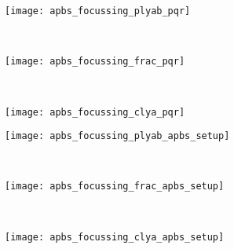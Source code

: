 \begin{figure*}[p]
  \centering
  \medskip
  \begin{minipage}[t]{50mm}
    \centering
    \begin{subfigure}[t]{50mm}
      \centering
      \caption{}\vspace{-5mm}\hspace{1.5mm}\label{fig:apbs_focussing_plyab_pqr}
      \texttt{[image: apbs\_focussing\_plyab\_pqr]}
    \end{subfigure}
    \\ \vspace{2mm}
    \centering
    \begin{subfigure}[t]{50mm}
      \centering
      \caption{}\vspace{-5mm}\hspace{1.5mm}\label{fig:apbs_focussing_frac_pqr}
      \texttt{[image: apbs\_focussing\_frac\_pqr]}
    \end{subfigure}
    \\ \vspace{2mm}
    \centering
    \begin{subfigure}[t]{50mm}
      \centering
      \caption{}\vspace{-5mm}\hspace{1.5mm}\label{fig:apbs_focussing_clya_pqr}
      \texttt{[image: apbs\_focussing\_clya\_pqr]}
    \end{subfigure}
  \end{minipage}
  \hspace{2mm}
  \begin{minipage}[t]{55mm}
    \centering
    \begin{subfigure}[t]{55mm}
      \centering
      \caption{}\vspace{-5mm}\hspace{1.5mm}\label{fig:apbs_focussing_plyab_apbs_setup}
      \texttt{[image: apbs\_focussing\_plyab\_apbs\_setup]}
    \end{subfigure}
    \\ \vspace{2mm}
    \begin{subfigure}[t]{55mm}
      \centering
      \caption{}\vspace{-5mm}\hspace{1.5mm}\label{fig:apbs_focussing_frac_apbs_setup}
      \texttt{[image: apbs\_focussing\_frac\_apbs\_setup]}
    \end{subfigure}
    \\ \vspace{2mm}
    \begin{subfigure}[t]{55mm}
      \centering
      \caption{}\vspace{-5mm}\hspace{1.5mm}\label{fig:apbs_focussing_clya_apbs_setup}
      \texttt{[image: apbs\_focussing\_clya\_apbs\_setup]}
    \end{subfigure}
  \end{minipage}


\end{figure*}
